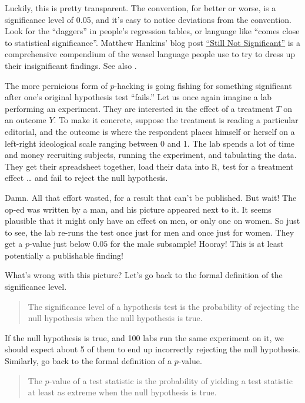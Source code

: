 \documentclass[12pt,oneside,openany]{book}
\begin{document}
Luckily, this is pretty transparent. The convention, for better or
worse, is a significance level of 0.05, and it's easy to notice
deviations from the convention. Look for the ``daggers'' in people's
regression tables, or language like ``comes close to statistical
significance''. Matthew Hankins' blog post
\href{https://mchankins.wordpress.com/2013/04/21/still-not-significant-2/}{``Still
Not Significant''} is a comprehensive compendium of the weasel language
people use to try to dress up their insignificant findings. See also
\citet{pritschet2016marginally}.

The more pernicious form of \(p\)-hacking is going fishing for something
significant after one's original hypothesis test ``fails.'' Let us once
again imagine a lab performing an experiment. They are interested in the
effect of a treatment \(T\) on an outcome \(Y\). To make it concrete,
suppose the treatment is reading a particular editorial, and the outcome
is where the respondent places himself or herself on a left-right
ideological scale ranging between 0 and 1. The lab spends a lot of time
and money recruiting subjects, running the experiment, and tabulating
the data. They get their spreadsheet together, load their data into R,
test for a treatment effect \ldots{} and fail to reject the null
hypothesis.

Damn. All that effort wasted, for a result that can't be published. But
wait! The op-ed was written by a man, and his picture appeared next to
it. It seems plausible that it might only have an effect on men, or only
one on women. So just to see, the lab re-runs the test once just for men
and once just for women. They get a \(p\)-value just below \(0.05\) for
the male subsample! Hooray! This is at least potentially a publishable
finding!

What's wrong with this picture? Let's go back to the formal definition
of the significance level.

\begin{quote}
The significance level of a hypothesis test is the probability of
rejecting the null hypothesis when the null hypothesis is true.
\end{quote}

If the null hypothesis is true, and 100 labs run the same experiment on
it, we should expect about 5 of them to end up incorrectly rejecting the
null hypothesis. Similarly, go back to the formal definition of a
\(p\)-value.

\begin{quote}
The \(p\)-value of a test statistic is the probability of yielding a
test statistic at least as extreme when the null hypothesis is true.
\end{quote}
\end{document}
